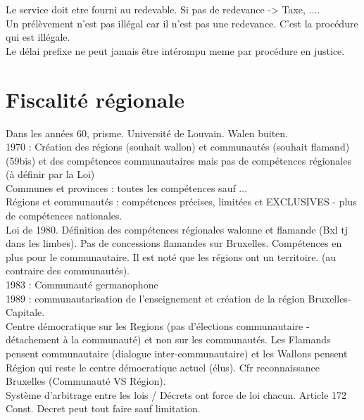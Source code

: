 \documentclass{book}
\begin{document}
Le service doit etre fourni au redevable. Si pas de redevance -> Taxe, ....\\

Un prélèvement n'est pas illégal car il n'est pas une redevance. C'est la procédure qui est illégale.\\

Le délai prefixe ne peut jamais être intérompu meme par procédure en justice.\\


\chapter{Fiscalité régionale}

Dans les années 60, prisme. Université de Louvain. Walen buiten.\\

1970 : Création des régions (souhait wallon) et communautés (souhait flamand) (59bis) et des compétences communautaires mais pas de compétences régionales (à définir par la Loi)\\

Communes et provinces : toutes les compétences sauf ...\\

Régions et communautés : compétences précises, limitées et EXCLUSIVES - plus de compétences nationales.\\

Loi de 1980. Définition des compétences régionales walonne et flamande (Bxl tj dans les limbes). Pas de concessions flamandes sur Bruxelles. Compétences en plus pour le communautaire. Il est noté que les régions ont un territoire. (au contraire des communautés).\\

1983 : Communauté germanophone\\

1989 : communautarisation de l'enseignement et création de la région Bruxelles-Capitale.\\

Centre démocratique sur les Regions (pas d'élections communautaire - détachement à la communauté) et non sur les communautés. Les Flamands pensent communautaire (dialogue inter-communautaire) et les Wallons pensent Région qui reste le centre démocratique actuel (élus). Cfr reconnaissance Bruxelles (Communauté VS Région).\\

Système d'arbitrage entre les lois / Décrets ont force de loi chacun. Article 172 Const. Decret peut tout faire sauf limitation.\\
\end{document}
